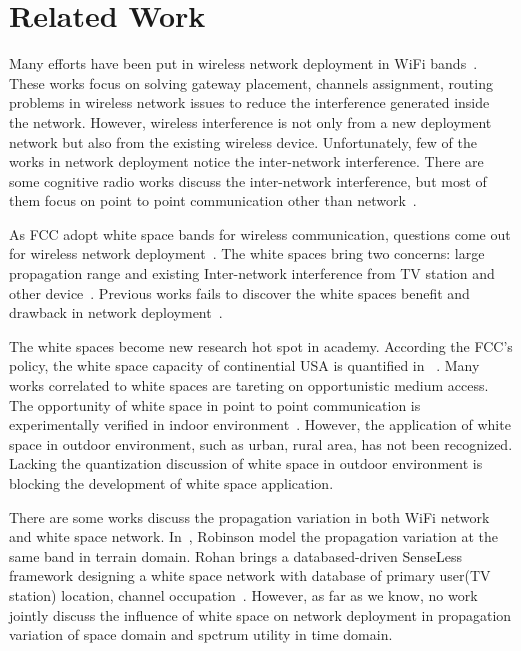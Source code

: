 \section{Related Work}
\label{sec:related}

Many efforts have been put in wireless network deployment in WiFi bands~\cite{he2008optimizing,ramachandran2006interference,akyildiz2006next}.
These works focus on solving gateway placement, channels assignment, routing 
problems in wireless network issues to reduce the interference generated inside the network.
However, wireless interference is not only from a new deployment network but also from the
existing wireless device. Unfortunately, few of the works in network deployment notice the 
inter-network interference. There are some cognitive radio works discuss the inter-network
interference, but most of them focus on point to point communication other than network~\cite{cabric2004implementation}.

As FCC adopt white space bands for wireless communication, questions come out 
for wireless network deployment~\cite{fccwhitespace}. The white spaces bring two
concerns: large propagation range and existing Inter-network interference from 
TV station and other device~\cite{cui2013leveraging,bahl2009white}.
Previous works fails to discover the white spaces benefit and drawback in network deployment~\cite{akyildiz2005wireless}.

The white spaces become new research hot spot in academy.
According the FCC's policy, the white space capacity of continential USA is quantified in ~\cite{harrison2010much}.
Many works correlated to white spaces are tareting on opportunistic medium access. The opportunity of white space
in point to point communication is experimentally verified in indoor environment~\cite{obregon2010experimental}.
However, the application of white space in outdoor environment, such as urban, rural area, has not been recognized.
Lacking the quantization discussion of white space in outdoor environment is blocking the development of white space
application.

There are some works discuss the propagation variation in both WiFi network and white space network.
In~\cite{robinson2010deploying}, Robinson model the propagation variation at the same band in terrain 
domain. Rohan brings a databased-driven SenseLess framework designing a white space network with 
database of primary user(TV station) location, channel occupation~\cite{murty2012senseless}. 
However, as far as we know, no work jointly discuss the influence of white space on network deployment in 
propagation variation of space domain and spctrum utility in time domain.



 


